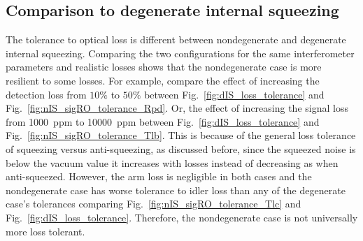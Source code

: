 \subsection{Comparison to degenerate internal squeezing}

The tolerance to optical loss is different between nondegenerate and degenerate internal squeezing. Comparing the two configurations for the same interferometer parameters and realistic losses shows that the nondegenerate case is more resilient to some losses. For example, compare the effect of increasing the detection loss from $10\%$ to $50\%$ between Fig.~\ref{fig:dIS_loss_tolerance} and Fig.~\ref{fig:nIS_sigRO_tolerance_Rpd}. Or, the effect of increasing the signal loss from 1000~ppm to 10000~ppm between Fig.~\ref{fig:dIS_loss_tolerance} and Fig.~\ref{fig:nIS_sigRO_tolerance_Tlb}. 
This is because of the general loss tolerance of squeezing versus anti-squeezing, as discussed before, since the squeezed noise is below the vacuum value it increases with losses instead of decreasing as when anti-squeezed. %
However, the arm loss is negligible in both cases and the nondegenerate case has worse tolerance to idler loss than any of the degenerate case's tolerances comparing Fig.~\ref{fig:nIS_sigRO_tolerance_Tlc} and Fig.~\ref{fig:dIS_loss_tolerance}. Therefore, the nondegenerate case is not universally more loss tolerant. %
